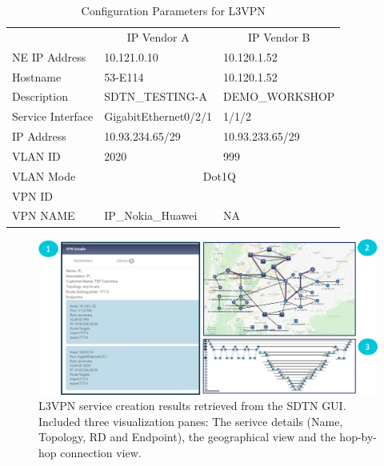 \documentclass[a4paper,fleqn]{cas-dc}
\begin{document}
\begin{table}[]
\caption{Configuration Parameters for L3VPN}
\begin{adjustbox}{width=0.5\textwidth}
\small
\begin{tabular}{lll}
& \multicolumn{1}{c}{IP Vendor A} & \multicolumn{1}{c}{IP Vendor B} \\
{\color[HTML]{000000} NE IP Address} & {\color[HTML]{000000} 10.121.0.10}          & {\color[HTML]{000000} 10.120.1.52}     \\
\rowcolor[HTML]{F2F2F2} 
{\color[HTML]{000000} Hostname}            & {\color[HTML]{000000} 53-E114}              & {\color[HTML]{000000} 10.120.1.52}     \\
{\color[HTML]{000000} Description}         & {\color[HTML]{000000} SDTN\_TESTING-A}      & {\color[HTML]{000000} DEMO\_WORKSHOP} \\
\rowcolor[HTML]{F2F2F2} 
{\color[HTML]{000000} Service   Interface} & {\color[HTML]{000000} GigabitEthernet0/2/1} & {\color[HTML]{000000} 1/1/2}           \\
{\color[HTML]{000000} IP Address}          & {\color[HTML]{000000} 10.93.234.65/29}      & {\color[HTML]{000000} 10.93.233.65/29} \\
\rowcolor[HTML]{F2F2F2} 
{\color[HTML]{000000} VLAN   ID}           & {\color[HTML]{000000} 2020}                 & {\color[HTML]{000000} 999}             \\
{\color[HTML]{000000} VLAN Mode}           & \multicolumn{2}{c}{{\color[HTML]{000000} Dot1Q}}                                     \\
\rowcolor[HTML]{F2F2F2} 
{\color[HTML]{000000} VPN   ID}            & \multicolumn{2}{c}{\cellcolor[HTML]{F2F2F2}{\color[HTML]{000000} 15}} \\
{\color[HTML]{000000} VPN NAME}           & {\color[HTML]{000000} IP\_Nokia\_Huawei}                 & {\color[HTML]{000000} NA} 
\end{tabular}
\end{adjustbox}
\label{TAB:discovered_ip_l3vpn}
\end{table}

\begin{figure}
	\centering
		\includegraphics[width=\linewidth]{figs/l3vpn_results.png}
	\caption{L3VPN service creation results retrieved from the SDTN GUI. Included three visualization panes: The serivce details (Name, Topology, RD and Endpoint), the geographical view and the hop-by-hop connection view.}
	\label{FIG:l3vpn_results}
\end{figure}
\end{document}
